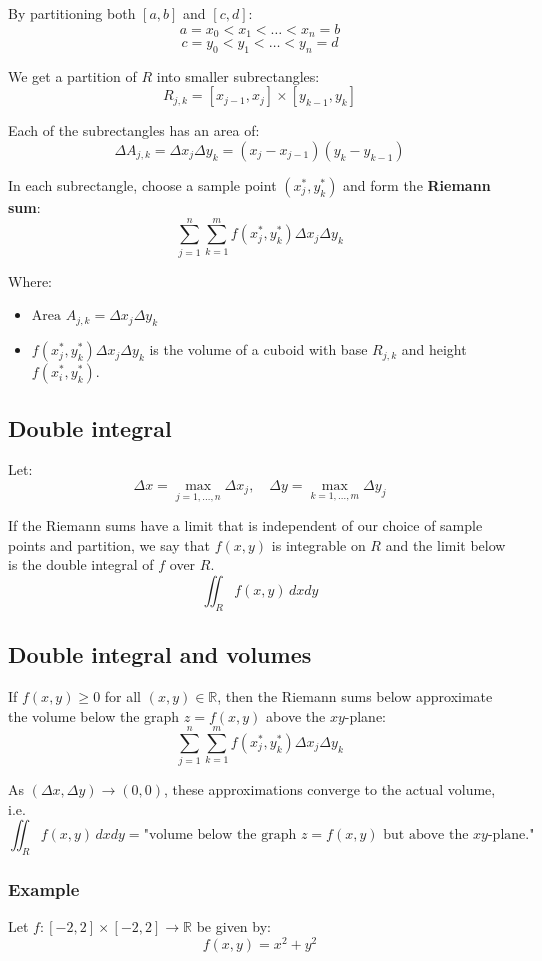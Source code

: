 \documentclass[11pt]{article}
\begin{document}
By partitioning both \([a, b]\) and \([c, d]\):
\[a = x_0 < x_1 < \ldots < x_n = b\]
\[c = y_0 < y_1 < \ldots < y_n = d\]

We get a partition of \(R\) into smaller subrectangles:
\[R_{j, k} = [x_{j - 1}, x_j] \times [y_{k - 1}, y_k]\]

Each of the subrectangles has an area of:
\[\Delta A_{j, k} = \Delta x_j \Delta y_k = (x_j - x_{j - 1})(y_k - y_{k - 1})\]

In each subrectangle, choose a sample point \((x_j^*, y_k^*)\) and form the \textbf{Riemann sum}:
\[\sum_{j = 1}^n \sum_{k = 1}^m f(x_j^*, y_k^*) \Delta x_j \Delta y_k\]

Where:
\begin{itemize}
\item \(\text{Area } A_{j, k} = \Delta x_j \Delta y_k\)
\item \(f(x_j^*, y_k^*) \Delta x_j \Delta y_k\) is the volume of a cuboid with base \(R_{j, k}\) and height \(f(x_i^*, y_k^*)\).
\end{itemize}

\subsection{Double integral}
\label{sec:orgea8ff71}
Let:
\[\Delta x = \max_{j = 1, \ldots, n} \Delta x_j, \quad \Delta y = \max_{k = 1, \ldots, m} \Delta y_j\]

If the Riemann sums have a limit that is independent of our choice of sample points and partition, we say that \(f(x, y)\) is integrable on \(R\) and the limit below is the double integral of \(f\) over \(R\).
\[\iint_R f(x, y) \, dx dy\]

\subsection{Double integral and volumes}
\label{sec:org205deea}
If \(f(x, y) \ge 0\) for all \((x, y) \in \mathbb{R}\), then the Riemann sums below approximate the volume below the graph \(z = f(x, y)\) above the \(xy\)-plane:
\[\sum_{j = 1}^n \sum_{k = 1}^m f(x_j^*, y_k^*) \Delta x_j \Delta y_k\]

As \((\Delta x, \Delta y) \rightarrow (0, 0)\), these approximations converge to the actual volume, i.e.
\[\iint_R f(x, y) \, dx dy = \text{"volume below the graph } z = f(x, y) \text{ but above the } xy \text{-plane."}\]

\subsubsection{Example}
\label{sec:orgf25ea52}
Let \(f : [-2, 2] \times [-2, 2] \rightarrow \mathbb{R}\) be given by:
\[f(x, y) = x^2 + y^2\]
\end{document}
